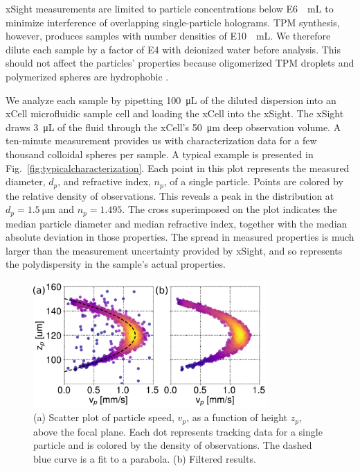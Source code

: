 \documentclass[journal=langd5,manuscript=article]{achemso}
\begin{document}
xSight measurements are limited to particle concentrations
below \SI{E6}{\per\milli\liter} to minimize interference
of overlapping single-particle holograms.
TPM synthesis, however,
produces samples with number densities of \SI{E10}{\per\milli\liter}.
We therefore
dilute each sample by a factor of \num{E4}
with deionized water before analysis.
This should not affect the particles'
properties because oligomerized TPM droplets and 
polymerized spheres are hydrophobic \cite{vanderwel17}.

We analyze each sample by pipetting \SI{100}{\micro\liter} of the diluted
dispersion into an xCell microfluidic sample cell and loading the xCell into the xSight.
The xSight draws \SI{3}{\micro\liter} of the fluid through
the xCell's \SI{50}{\um} deep observation volume.
A ten-minute measurement provides us with
characterization data for a few thousand colloidal spheres per sample.
A typical example is presented in Fig.~\ref{fig:typicalcharacterization}.
Each point in this plot represents the measured diameter, $d_p$,
and refractive index, $n_p$, of a single particle.  Points are
colored by the relative density of observations.
This reveals a peak in the distribution at $d_p = \SI{1.5}{\um}$
and $n_p = \num{1.495}$. The cross superimposed on the plot indicates
the median particle diameter and median refractive index, together
with the median absolute deviation in those properties.
The spread in measured properties is much larger than the
measurement uncertainty provided by xSight, and so represents
the polydispersity in the sample's actual properties.

\begin{figure}
  \centering
  \includegraphics[width=0.8\textwidth]{velocity_plots}
  \caption{(a) Scatter plot of particle speed, 
    $v_p$, as a function of
    height $z_p$, above the focal plane.  Each dot represents
    tracking data for a single particle and is colored
    by the density of observations. The dashed blue curve
    is a fit to a parabola.
    (b) Filtered results.}
  \label{fig:flow_prof}
\end{figure}
\end{document}
